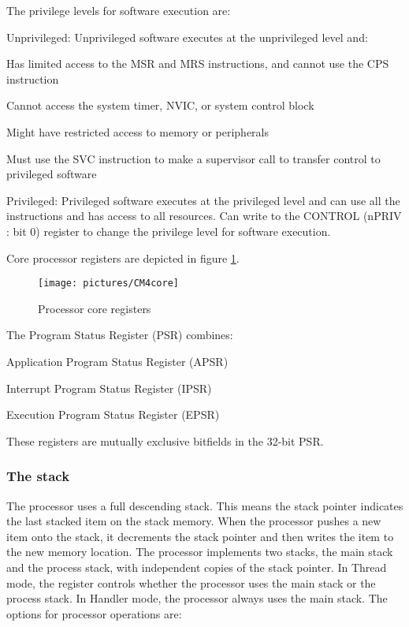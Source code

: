 The privilege levels for software execution are:
\begin{penum}
\item Unprivileged: Unprivileged software executes at the unprivileged level and:
	\begin{penum}
	\item Has limited access to the MSR and MRS instructions, and cannot use the CPS instruction
	\item Cannot access the system timer, NVIC, or system control block
	\item Might have restricted access to memory or peripherals
	\item Must use the SVC instruction to make a supervisor call to transfer control to privileged software
	\end{penum}
\item Privileged: Privileged software executes at the privileged level and can use all the instructions and has access to all resources.
Can write to the CONTROL (nPRIV : bit 0) register to change the privilege level for software execution.
\end{penum}

Core processor registers are depicted in figure \ref{fig:CM4core}.

\begin{figure}[htbp] %
\begin{minipage}{0.5\textwidth}
    \centering
  \texttt{[image: pictures/CM4core]} 
\end{minipage}
\begin{minipage}{0.5\textwidth}
   \caption{Processor core registers}\label{fig:CM4core}
\end{minipage}
\end{figure}

The Program Status Register (PSR) combines:
\begin{penum}
\item Application Program Status Register (APSR)
\item Interrupt Program Status Register (IPSR)
\item Execution Program Status Register (EPSR)
\end{penum}

These registers are mutually exclusive bitfields in the 32-bit PSR.

\subsubsection{The stack}
The processor uses a full descending stack. This means the stack pointer indicates the last stacked item on the stack memory. When the processor pushes a new item onto the stack, it decrements the stack pointer and then writes the item to the new memory location. The processor implements two stacks, the main stack and the process stack, with independent copies of the stack pointer.
In Thread mode, the  register controls whether the processor uses the main stack or the process stack. In Handler mode, the processor always uses the main stack.
The options for processor operations are:


